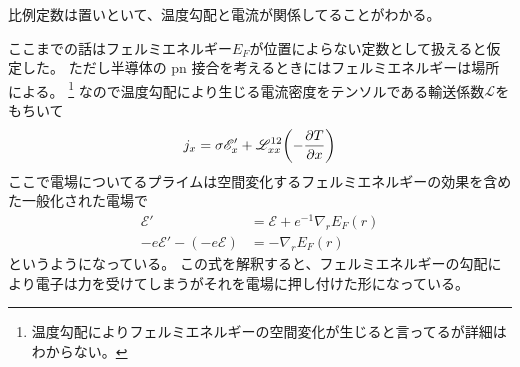 \documentclass[11pt,dvipdfmx,a4paper]{jsarticle}
\begin{document}
比例定数は置いといて、温度勾配と電流が関係してることがわかる。

ここまでの話はフェルミエネルギー\(E_F\)が位置によらない定数として扱えると仮定した。
ただし半導体の pn 接合を考えるときにはフェルミエネルギーは場所による。
\footnote{温度勾配によりフェルミエネルギーの空間変化が生じると言ってるが詳細はわからない。}
\newline
なので温度勾配により生じる電流密度をテンソルである輸送係数\(\mathscr{L}\)をもちいて
\begin{align}
    j_x = \sigma \mathscr{E}'_x + \mathscr{L}_{xx}^{12}\qty(-\pdv{T}{x}) %
\end{align}
ここで電場についてるプライムは空間変化するフェルミエネルギーの効果を含めた一般化された電場で
\begin{align}
    \mathscr{E}' &= \mathscr{E} + e^{-1}\nabla_r E_F(r)\\
    - e\mathscr{E}' - (-e\mathscr{E}) &= -\nabla_r E_F(r)
\end{align}
というようになっている。
この式を解釈すると、フェルミエネルギーの勾配により電子は力を受けてしまうがそれを電場に押し付けた形になっている。
\end{document}
